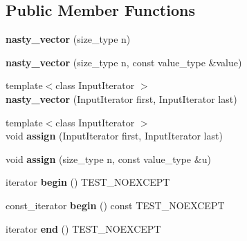 \subsection*{Public Member Functions}
\begin{DoxyCompactItemize}
\item 
\mbox{\label{classnasty__vector_a8170827dba594bac4a0fa0bda30b9bd6}} 
{\bfseries nasty\+\_\+vector} (size\+\_\+type n)
\item 
\mbox{\label{classnasty__vector_a212b25d02b30503df3301d7cdf78bac4}} 
{\bfseries nasty\+\_\+vector} (size\+\_\+type n, const value\+\_\+type \&value)
\item 
\mbox{\label{classnasty__vector_ac4168a989356739d46b50fb0df034290}} 
{\footnotesize template$<$class Input\+Iterator $>$ }\\{\bfseries nasty\+\_\+vector} (Input\+Iterator first, Input\+Iterator last)
\item 
\mbox{\label{classnasty__vector_a83ee8d63f7dceaaa0e8b4dc16540de85}} 
{\footnotesize template$<$class Input\+Iterator $>$ }\\void {\bfseries assign} (Input\+Iterator first, Input\+Iterator last)
\item 
\mbox{\label{classnasty__vector_af9fdbf95d8e99b5e36acc8f02f1222e3}} 
void {\bfseries assign} (size\+\_\+type n, const value\+\_\+type \&u)
\item 
\mbox{\label{classnasty__vector_a73864f0db4892332e8f62afbfed6fb19}} 
iterator {\bfseries begin} () T\+E\+S\+T\+\_\+\+N\+O\+E\+X\+C\+E\+PT
\item 
\mbox{\label{classnasty__vector_a066cb951e05155a810ec8a076ca571b2}} 
const\+\_\+iterator {\bfseries begin} () const T\+E\+S\+T\+\_\+\+N\+O\+E\+X\+C\+E\+PT
\item 
\mbox{\label{classnasty__vector_a01000f5668d6cf85d5f112819089bdf0}} 
iterator {\bfseries end} () T\+E\+S\+T\+\_\+\+N\+O\+E\+X\+C\+E\+PT
\item 
\mbox{\label{classnasty__vector_a25b61a20a9ec545c2b72848acdde3b8e}} 

\end{DoxyCompactItemize}
